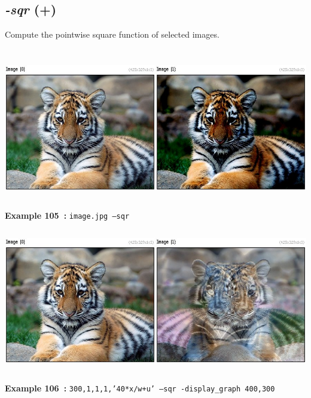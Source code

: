 \documentclass[a4paper,11pt,twoside]{book}
\begin{document}
\subsection{\emph{-sqr} (+)}\vspace*{-0.5em}
Compute the pointwise square function of selected images.
\begin{center}\includegraphics[keepaspectratio=true,height=7cm,width=\textwidth]{img/gmic_def105.jpg}\\
{\footnotesize \textbf{Example 105~:} \texttt{image.jpg --sqr}}
\\\includegraphics[keepaspectratio=true,height=7cm,width=\textwidth]{img/gmic_def106.jpg}\\
{\footnotesize \textbf{Example 106~:} \texttt{300,1,1,1,'40*x/w+u' --sqr -display\_graph 400,300}}
\end{center}
\end{document}
